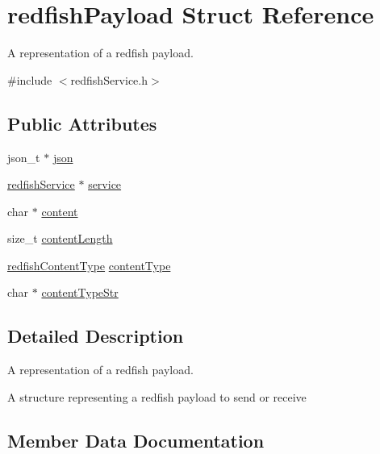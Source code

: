 \hypertarget{structredfishPayload}{}\section{redfish\+Payload Struct Reference}
\label{structredfishPayload}


A representation of a redfish payload.  




{\ttfamily \#include $<$redfish\+Service.\+h$>$}

\subsection*{Public Attributes}
\begin{DoxyCompactItemize}
\item 
json\+\_\+t $\ast$ \hyperlink{structredfishPayload_a8b13b895defa81ff8cb3948d948cea15}{json}
\item 
\hyperlink{redfishService_8h_a4c9115c0f0a21de971c0dfae06f26372}{redfish\+Service} $\ast$ \hyperlink{structredfishPayload_a0b04265e9d24b01897b3ddf031fa8fb7}{service}
\item 
char $\ast$ \hyperlink{structredfishPayload_aefe9bc46c07b92a1a2e5e110606ef628}{content}
\item 
size\+\_\+t \hyperlink{structredfishPayload_a0bced960effff58415523bd38510f793}{content\+Length}
\item 
\hyperlink{redfishService_8h_a743ef6fcbb87f07021f20c5c0073dc34}{redfish\+Content\+Type} \hyperlink{structredfishPayload_a95d4e3135f102a3b50fd7f2f24ef4c20}{content\+Type}
\item 
char $\ast$ \hyperlink{structredfishPayload_abe0f2b7cd57a69505715b9711a7c6e7c}{content\+Type\+Str}
\end{DoxyCompactItemize}


\subsection{Detailed Description}
A representation of a redfish payload. 

A structure representing a redfish payload to send or receive 

\subsection{Member Data Documentation}
\mbox{\label{structredfishPayload_aefe9bc46c07b92a1a2e5e110606ef628}} 
